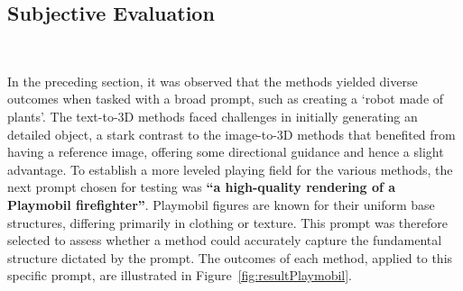 \subsection{Subjective Evaluation}~\label{subjective}

In the preceding section, it was observed that the methods yielded diverse outcomes when tasked with a broad prompt, such as creating a `robot made of plants'. The text-to-3D methods faced challenges in initially generating an detailed object, a stark contrast to the image-to-3D methods that benefited from having a reference image, offering some directional guidance and hence a slight advantage. To establish a more leveled playing field for the various methods, the next prompt chosen for testing was \textbf{``a high-quality rendering of a Playmobil firefighter''}. Playmobil figures are known for their uniform base structures, differing primarily in clothing or texture. This prompt was therefore selected to assess whether a method could accurately capture the fundamental structure dictated by the prompt. The outcomes of each method, applied to this specific prompt, are illustrated in Figure~\ref{fig:resultPlaymobil}. 

